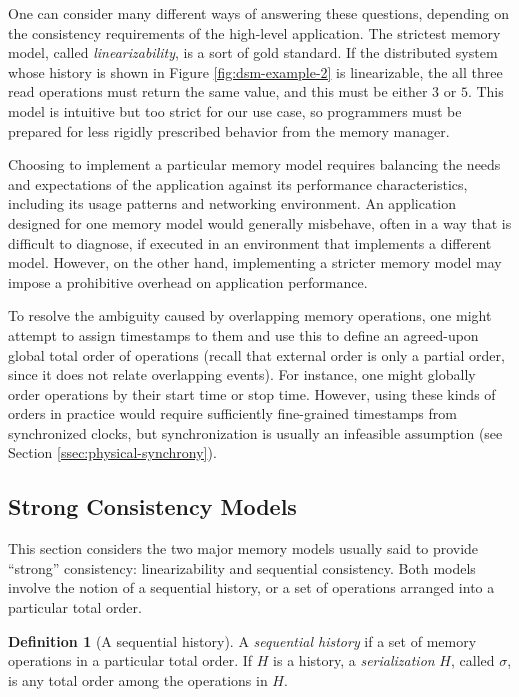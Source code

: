 \documentclass[]             %
{NASA}                       %
\theoremstyle{definition}
\newtheorem{definition}[theorem]{Definition}
\begin{document}
One can consider many different ways of answering these questions,
depending on the consistency requirements of the high-level
application. The strictest memory model, called
\emph{linearizability}, is a sort of gold standard. If the distributed
system whose history is shown in Figure \ref{fig:dsm-example-2} is
linearizable, the all three read operations must return the same
value, and this must be either $3$ or $5$. This model is intuitive but
too strict for our use case, so programmers must be prepared for less
rigidly prescribed behavior from the memory manager.

Choosing to implement a particular memory model requires balancing the
needs and expectations of the application against its performance
characteristics, including its usage patterns and networking
environment. An application designed for one memory model would
generally misbehave, often in a way that is difficult to diagnose, if
executed in an environment that implements a different model. However,
on the other hand, implementing a stricter memory model may impose a
prohibitive overhead on application performance.

To resolve the ambiguity caused by overlapping memory operations, one
might attempt to assign timestamps to them and use this to define an
agreed-upon global total order of operations (recall that external
order is only a partial order, since it does not relate overlapping
events). For instance, one might globally order operations by their
start time or stop time. However, using these kinds of orders in
practice would require sufficiently fine-grained timestamps from
synchronized clocks, but synchronization is usually an infeasible
assumption (see Section
\ref{ssec:physical-synchrony}). %

\subsection{Strong Consistency Models}
\label{ssec:strong-consistency}
This section considers the two major memory models usually said to
provide ``strong'' consistency: linearizability and sequential
consistency. Both models involve the notion of a sequential history,
or a set of operations arranged into a particular total order.

\begin{definition}[A sequential history]
  \label{def:sequential-history}
  A \emph{sequential history} if a set of memory operations in a
  particular total order. If $H$ is a history, a \emph{serialization}
  $H$, called $\sigma$, is any total order among the operations in
  $H$.
\end{definition}
\end{document}
